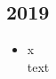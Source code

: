 \subsection{2019}
\begin{history}


    \begin{itemize}

        \item x\\
              text

    \end{itemize}

\end{history}
